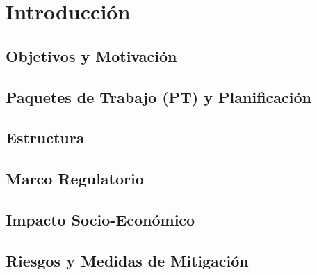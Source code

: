 \documentclass[12pt]{report} %
\renewcommand{\_}{\origunderscore\allowbreak}
\begin{document}
\newpage %
\thispagestyle{empty}
\mbox{}


\clearpage
{} %
\renewcommand{\footnotesize}{\tiny}  %


\chapter{Introducción}
\label{introduction}


\section{Objetivos y Motivación}
\label{sec:objectives_motivation}


\section{Paquetes de Trabajo (PT) y Planificación}
\label{sec:workmethodology_planning}


\section{Estructura}
\label{sec:thesis_structure}


\section{Marco Regulatorio}
\label{sec:reg_framework}


\section{Impacto Socio-Económico}
\label{sec:socioeconomic_impact}


\section{Riesgos y Medidas de Mitigación}
\label{sec:risks}

\end{document}
